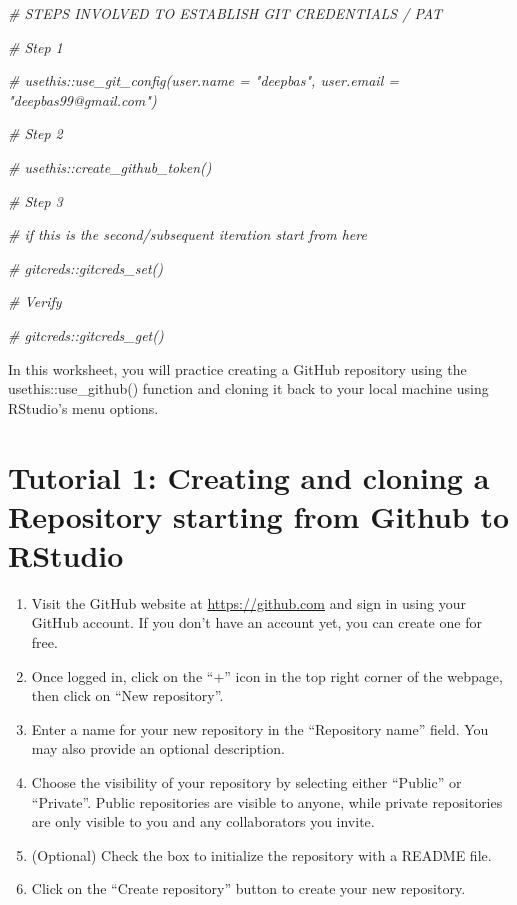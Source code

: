 \documentclass[
]{book}
\newenvironment{Shaded}{\begin{snugshade}}{\end{snugshade}}
\newcommand{\CommentTok}[1]{\textcolor[rgb]{0.56,0.35,0.01}{\textit{#1}}}
\begin{document}
\begin{Shaded}
\begin{Highlighting}[]
\CommentTok{\# STEPS INVOLVED TO ESTABLISH GIT CREDENTIALS / PAT}

\CommentTok{\# Step 1}

\CommentTok{\# usethis::use\_git\_config(user.name = "deepbas", user.email = "deepbas99@gmail.com")}

\CommentTok{\# Step 2}

\CommentTok{\# usethis::create\_github\_token()}

\CommentTok{\# Step 3}

\CommentTok{\# if this is the second/subsequent iteration start from here}

\CommentTok{\# gitcreds::gitcreds\_set()}

\CommentTok{\# Verify}

\CommentTok{\# gitcreds::gitcreds\_get()}
\end{Highlighting}
\end{Shaded}

In this worksheet, you will practice creating a GitHub repository using the usethis::use\_github() function and cloning it back to your local machine using RStudio's menu options.

\hypertarget{tutorial-1-creating-and-cloning-a-repository-starting-from-github-to-rstudio}{%
\section{Tutorial 1: Creating and cloning a Repository starting from Github to RStudio}\label{tutorial-1-creating-and-cloning-a-repository-starting-from-github-to-rstudio}}

\begin{enumerate}
\def\labelenumi{\arabic{enumi}.}
\item
  Visit the GitHub website at \url{https://github.com} and sign in using your GitHub account. If you don't have an account yet, you can create one for free.
\item
  Once logged in, click on the ``+'' icon in the top right corner of the webpage, then click on ``New repository''.
\item
  Enter a name for your new repository in the ``Repository name'' field. You may also provide an optional description.
\item
  Choose the visibility of your repository by selecting either ``Public'' or ``Private''. Public repositories are visible to anyone, while private repositories are only visible to you and any collaborators you invite.
\item
  (Optional) Check the box to initialize the repository with a README file.
\item
  Click on the ``Create repository'' button to create your new repository.
\end{enumerate}
\end{document}

